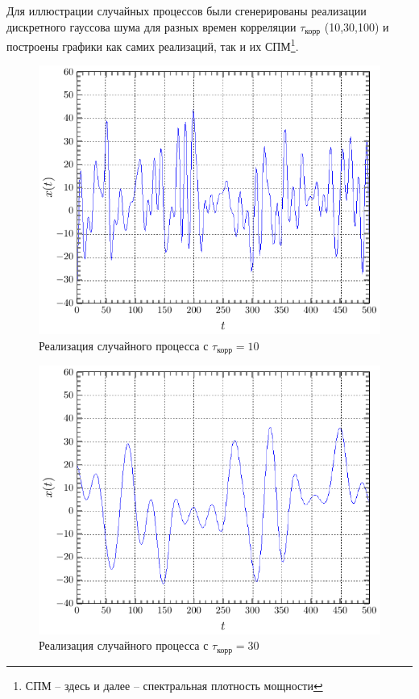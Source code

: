 \documentclass[a4paper,14pt]{extarticle}
\begin{document}
Для иллюстрации случайных процессов были сгенерированы реализации дискретного гауссова шума для разных времен корреляции $\tau_\text{корр}$ (10,30,100) и построены графики как самих реализаций, так и их СПМ\footnote{СПМ -- здесь и далее -- спектральная плотность мощности}.

\begin{figure}[H]
    \centering
    \includegraphics[width=0.7\linewidth]{fig/x_from_t_10.pdf}
    \vspace{-0.7em}
    \caption{Реализация случайного процесса с $\tau_\text{корр}=10$}
    \label{fig:t10}
\end{figure}

\begin{figure}[H]
    \centering
    \includegraphics[width=0.7\linewidth]{fig/x_from_t_30.pdf}
    \vspace{-0.7em}
    \caption{Реализация случайного процесса с $\tau_\text{корр}=30$}
    \label{fig:t30}
\end{figure}
\end{document}
